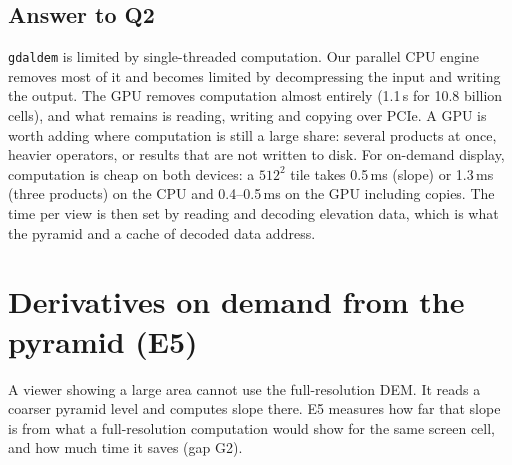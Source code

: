 \documentclass[11pt,a4paper]{article}
\begin{document}
\subsection{Answer to Q2}
\texttt{gdaldem} is limited by single-threaded computation. Our parallel CPU engine removes most of it and becomes
limited by decompressing the input and writing the output. The GPU removes computation almost entirely (1.1\,s for
10.8 billion cells), and what remains is reading, writing and copying over PCIe. A GPU is worth adding where
computation is still a large share: several products at once, heavier operators, or results that are not written to
disk. For on-demand display, computation is cheap on both devices: a $512^2$ tile takes 0.5\,ms (slope) or 1.3\,ms
(three products) on the CPU and 0.4--0.5\,ms on the GPU including copies. The time per view is then set by reading
and decoding elevation data, which is what the pyramid and a cache of decoded data address.

\section{Derivatives on demand from the pyramid (E5)}\label{sec:pyramid}
A viewer showing a large area cannot use the full-resolution DEM. It reads a coarser pyramid level and computes slope
there. E5 measures how far that slope is from what a full-resolution computation would show for the same screen
cell, and how much time it saves (gap G2).
\end{document}

